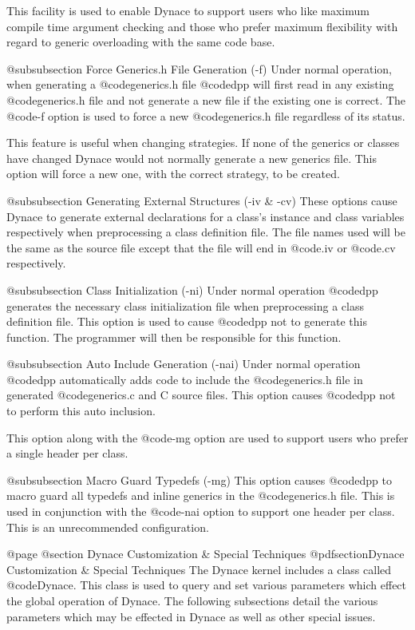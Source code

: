 This facility is used to enable Dynace to support users who like
maximum compile time argument checking and those who prefer maximum
flexibility with regard to generic overloading with the same code
base.

@subsubsection Force Generics.h File Generation (-f)
Under normal operation, when generating a @code{generics.h} file
@code{dpp} will first read in any existing @code{generics.h} file
and not generate a new file if the existing one is correct.  The
@code{-f} option is used to force a new @code{generics.h} file
regardless of its status.

This feature is useful when changing strategies.  If none of the generics
or classes have changed Dynace would not normally generate a new generics
file.  This option will force a new one, with the correct strategy, to
be created.

@subsubsection Generating External Structures (-iv & -cv)
These options cause Dynace to generate external declarations for
a class's instance and class variables respectively when preprocessing
a class definition file.  The file names used will be the same as
the source file except that the file will end in @code{.iv} or
@code{.cv} respectively.

@subsubsection Class Initialization (-ni)
Under normal operation @code{dpp} generates the necessary class
initialization file when preprocessing a class definition file.
This option is used to cause @code{dpp} not to generate this
function.  The programmer will then be responsible for this
function.

@subsubsection Auto Include Generation (-nai)
Under normal operation @code{dpp} automatically adds code to include the
@code{generics.h} file in generated @code{generics.c} and C source
files.  This option causes @code{dpp} not to perform this auto inclusion.

This option along with the @code{-mg} option are used to support
users who prefer a single header per class.

@subsubsection Macro Guard Typedefs (-mg)
This option causes @code{dpp} to macro guard all typedefs and inline
generics in the @code{generics.h} file.  This is used in conjunction
with the @code{-nai} option to support one header per class.  This is an
unrecommended configuration.


@page
@section Dynace Customization & Special Techniques
@pdfsection{Dynace Customization & Special Techniques}
The Dynace kernel includes a class called @code{Dynace}.  This class is used
to query and set various parameters which effect the global operation
of Dynace.  The following subsections detail the various parameters which
may be effected in Dynace as well as other special issues.

